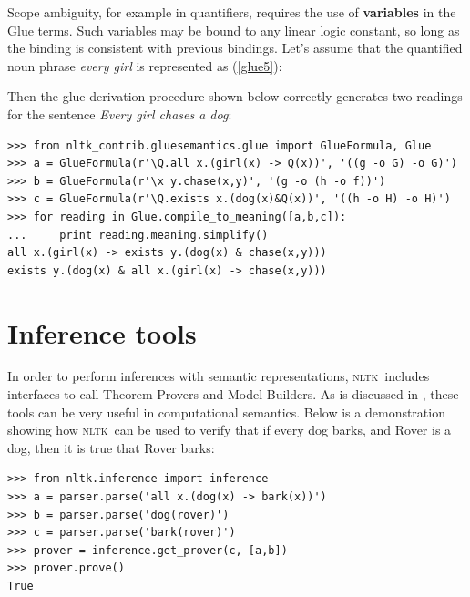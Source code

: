 \documentclass[11pt,a4paper]{article}
\newcommand{\NLTK}{\textsc{nltk}}
\begin{document}

Scope ambiguity, for example in quantifiers, requires the use of
\textbf{variables} in the Glue terms. Such variables may be bound to
any linear logic constant, so long as the binding is consistent with
previous bindings. Let's assume that the quantified noun phrase
\textit{every girl} is represented as (\ref{glue5}):

Then the glue derivation procedure shown below correctly
generates two readings for the sentence \textit{Every girl chases a dog}:
\begin{verbatim}
>>> from nltk_contrib.gluesemantics.glue import GlueFormula, Glue
>>> a = GlueFormula(r'\Q.all x.(girl(x) -> Q(x))', '((g -o G) -o G)')
>>> b = GlueFormula(r'\x y.chase(x,y)', '(g -o (h -o f))')
>>> c = GlueFormula(r'\Q.exists x.(dog(x)&Q(x))', '((h -o H) -o H)')
>>> for reading in Glue.compile_to_meaning([a,b,c]):
...     print reading.meaning.simplify()
all x.(girl(x) -> exists y.(dog(x) & chase(x,y)))
exists y.(dog(x) & all x.(girl(x) -> chase(x,y)))
\end{verbatim}


\section{Inference tools}
In order to perform inferences with semantic representations, \NLTK\
includes interfaces to call Theorem Provers and Model Builders.  As is
discussed in \cite{BB}, these tools can be very useful in
computational semantics.  Below is a demonstration showing how \NLTK\
can be used to verify that if every dog barks, and Rover is a dog,
then it is true that Rover barks:

\begin{verbatim}
>>> from nltk.inference import inference
>>> a = parser.parse('all x.(dog(x) -> bark(x))')
>>> b = parser.parse('dog(rover)')
>>> c = parser.parse('bark(rover)')
>>> prover = inference.get_prover(c, [a,b])
>>> prover.prove()
True
\end{verbatim}
\end{document}
